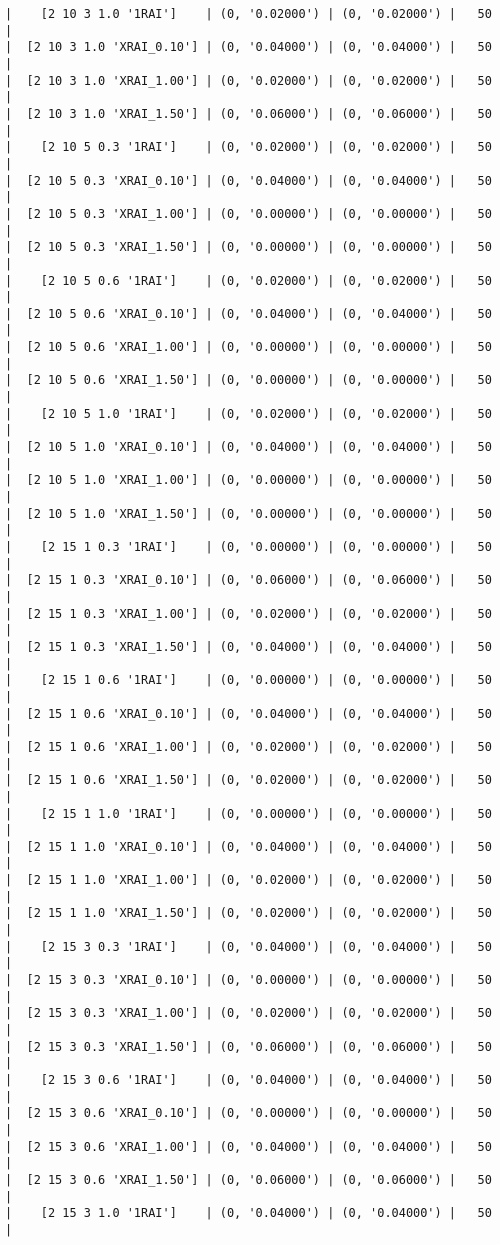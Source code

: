 \documentclass{article}
\begin{document}
\begin{verbatim}
|    [2 10 3 1.0 '1RAI']    | (0, '0.02000') | (0, '0.02000') |   50  |
|  [2 10 3 1.0 'XRAI_0.10'] | (0, '0.04000') | (0, '0.04000') |   50  |
|  [2 10 3 1.0 'XRAI_1.00'] | (0, '0.02000') | (0, '0.02000') |   50  |
|  [2 10 3 1.0 'XRAI_1.50'] | (0, '0.06000') | (0, '0.06000') |   50  |
|    [2 10 5 0.3 '1RAI']    | (0, '0.02000') | (0, '0.02000') |   50  |
|  [2 10 5 0.3 'XRAI_0.10'] | (0, '0.04000') | (0, '0.04000') |   50  |
|  [2 10 5 0.3 'XRAI_1.00'] | (0, '0.00000') | (0, '0.00000') |   50  |
|  [2 10 5 0.3 'XRAI_1.50'] | (0, '0.00000') | (0, '0.00000') |   50  |
|    [2 10 5 0.6 '1RAI']    | (0, '0.02000') | (0, '0.02000') |   50  |
|  [2 10 5 0.6 'XRAI_0.10'] | (0, '0.04000') | (0, '0.04000') |   50  |
|  [2 10 5 0.6 'XRAI_1.00'] | (0, '0.00000') | (0, '0.00000') |   50  |
|  [2 10 5 0.6 'XRAI_1.50'] | (0, '0.00000') | (0, '0.00000') |   50  |
|    [2 10 5 1.0 '1RAI']    | (0, '0.02000') | (0, '0.02000') |   50  |
|  [2 10 5 1.0 'XRAI_0.10'] | (0, '0.04000') | (0, '0.04000') |   50  |
|  [2 10 5 1.0 'XRAI_1.00'] | (0, '0.00000') | (0, '0.00000') |   50  |
|  [2 10 5 1.0 'XRAI_1.50'] | (0, '0.00000') | (0, '0.00000') |   50  |
|    [2 15 1 0.3 '1RAI']    | (0, '0.00000') | (0, '0.00000') |   50  |
|  [2 15 1 0.3 'XRAI_0.10'] | (0, '0.06000') | (0, '0.06000') |   50  |
|  [2 15 1 0.3 'XRAI_1.00'] | (0, '0.02000') | (0, '0.02000') |   50  |
|  [2 15 1 0.3 'XRAI_1.50'] | (0, '0.04000') | (0, '0.04000') |   50  |
|    [2 15 1 0.6 '1RAI']    | (0, '0.00000') | (0, '0.00000') |   50  |
|  [2 15 1 0.6 'XRAI_0.10'] | (0, '0.04000') | (0, '0.04000') |   50  |
|  [2 15 1 0.6 'XRAI_1.00'] | (0, '0.02000') | (0, '0.02000') |   50  |
|  [2 15 1 0.6 'XRAI_1.50'] | (0, '0.02000') | (0, '0.02000') |   50  |
|    [2 15 1 1.0 '1RAI']    | (0, '0.00000') | (0, '0.00000') |   50  |
|  [2 15 1 1.0 'XRAI_0.10'] | (0, '0.04000') | (0, '0.04000') |   50  |
|  [2 15 1 1.0 'XRAI_1.00'] | (0, '0.02000') | (0, '0.02000') |   50  |
|  [2 15 1 1.0 'XRAI_1.50'] | (0, '0.02000') | (0, '0.02000') |   50  |
|    [2 15 3 0.3 '1RAI']    | (0, '0.04000') | (0, '0.04000') |   50  |
|  [2 15 3 0.3 'XRAI_0.10'] | (0, '0.00000') | (0, '0.00000') |   50  |
|  [2 15 3 0.3 'XRAI_1.00'] | (0, '0.02000') | (0, '0.02000') |   50  |
|  [2 15 3 0.3 'XRAI_1.50'] | (0, '0.06000') | (0, '0.06000') |   50  |
|    [2 15 3 0.6 '1RAI']    | (0, '0.04000') | (0, '0.04000') |   50  |
|  [2 15 3 0.6 'XRAI_0.10'] | (0, '0.00000') | (0, '0.00000') |   50  |
|  [2 15 3 0.6 'XRAI_1.00'] | (0, '0.04000') | (0, '0.04000') |   50  |
|  [2 15 3 0.6 'XRAI_1.50'] | (0, '0.06000') | (0, '0.06000') |   50  |
|    [2 15 3 1.0 '1RAI']    | (0, '0.04000') | (0, '0.04000') |   50  |

\end{verbatim}
\end{document}
